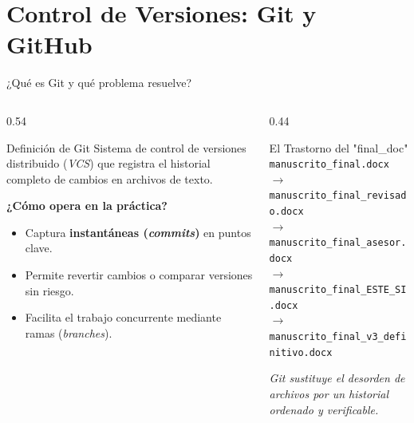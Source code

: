 \documentclass[aspectratio=169, 10pt]{beamer}
\begin{document}
\section[Git \& GitHub]{Control de Versiones: Git y GitHub}

\begin{frame}{¿Qué es Git y qué problema resuelve?}
  \begin{columns}[T]
    \begin{column}{0.54\textwidth}
      \begin{block}{Definición de Git}
        \small
        Sistema de control de versiones distribuido (\textit{VCS}) que registra el historial completo de cambios en archivos de texto.
      \end{block}

      \vspace{0.1cm}
      \textbf{\small ¿Cómo opera en la práctica?}
      \small
      \begin{itemize}
        \item Captura \textbf{instantáneas (\textit{commits})} en puntos clave.
        \item Permite revertir cambios o comparar versiones sin riesgo.
        \item Facilita el trabajo concurrente mediante ramas (\textit{branches}).
      \end{itemize}
    \end{column}

    \begin{column}{0.44\textwidth}
      \begin{alertblock}{El Trastorno del "final\_doc"}
        \scriptsize
        \texttt{manuscrito\_final.docx} \\
        $\to$ \texttt{manuscrito\_final\_revisado.docx} \\
        $\to$ \texttt{manuscrito\_final\_asesor.docx} \\
        $\to$ \texttt{manuscrito\_final\_ESTE\_SI.docx} \\
        $\to$ \texttt{manuscrito\_final\_v3\_definitivo.docx}
      \end{alertblock}
      \vspace{0.12cm}
      \begin{center}
        \scriptsize\textit{Git sustituye el desorden de archivos por un historial ordenado y verificable.}
      \end{center}
    \end{column}
  \end{columns}
\end{frame}
\end{document}
